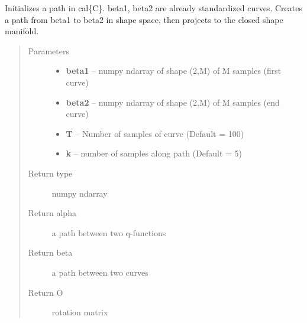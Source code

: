 \documentclass[letterpaper,10pt,english]{sphinxmanual}
\begin{document}
\begin{fulllineitems}
\label{geodesic:geodesic.init_path_geod}
Initializes a path in cal\{C\}. beta1, beta2 are already
standardized curves. Creates a path from beta1 to beta2 in
shape space, then projects to the closed shape manifold.
\begin{quote}\begin{description}
\item[{Parameters}] \leavevmode\begin{itemize}
\item {} 
\textbf{beta1} -- numpy ndarray of shape (2,M) of M samples (first curve)

\item {} 
\textbf{beta2} -- numpy ndarray of shape (2,M) of M samples (end curve)

\item {} 
\textbf{T} -- Number of samples of curve (Default = 100)

\item {} 
\textbf{k} -- number of samples along path (Default = 5)

\end{itemize}

\item[{Return type}] \leavevmode
numpy ndarray

\item[{Return alpha}] \leavevmode
a path between two q-functions

\item[{Return beta}] \leavevmode
a path between two curves

\item[{Return O}] \leavevmode
rotation matrix

\end{description}\end{quote}

\end{fulllineitems}

\end{document}
